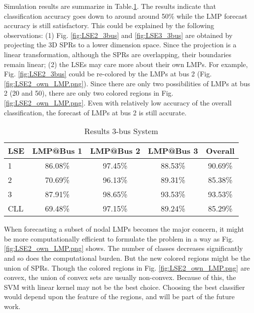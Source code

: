 \documentclass[letterpaper, 11pt]{article}
\theoremstyle{plain}
\theoremstyle{definition}
\begin{document}
Simulation results are summarize in Table.\ref{tab:LMP_forecast_lse_3bus_alllmp}.  
The results indicate that classification accuracy goes down to around around 50\% while the LMP forecast accuracy is still satisfactory. 
This could be explained by the following observations: (1) Fig. \ref{fig:LSE2_3bus} and \ref{fig:LSE3_3bus} are obtained by projecting the 3D SPRs to a lower dimension space. Since the projection is a linear transformation, although the SPRs are overlapping, their boundaries remain linear; (2) the LSEs may care more about their own LMPs. For example, Fig. \ref{fig:LSE2_3bus} could be re-colored by the LMPs at bus 2 (Fig. \ref{fig:LSE2_own_LMP.png}). Since there are only two possibilities of LMPs at bus 2 (20 and 50), there are only two colored regions in Fig. \ref{fig:LSE2_own_LMP.png}. Even with relatively low accuracy of the overall classification, the forecast of LMPs at bus 2 is still accurate.
\begin{table}[htbp]
  \caption{Results 3-bus System}
  \label{tab:LMP_forecast_lse_3bus_alllmp}
  \centering

  \begin{tabular}{l|cccc}
  \hline

  \hline
  \textbf{LSE} & \textbf{LMP@Bus 1} & \textbf{LMP@Bus 2} & \textbf{LMP@Bus 3} & \textbf{Overall}\\
  \hline
  1  & 86.08\%  &97.45\%  & 88.53\%  & 90.69\%\\
  2  &70.69\% & 96.13\% & 89.31\%   &  85.38\%\\
  3  &87.91\% & 98.65\% & 93.53\%  & 93.53\%\\
  \hline
  CLL & 69.48\% & 97.15\% & 89.24\% & 85.29\% \\
  \hline

  \hline
  \end{tabular}
\end{table}

When forecasting a subset of nodal LMPs becomes the major concern, it might be more computationally efficient to formulate the problem in a way as Fig. \ref{fig:LSE2_own_LMP.png} shows. The number of classes decreases significantly and so does the computational burden. But the new colored regions might be the union of SPRs. Though the colored regions in Fig. \ref{fig:LSE2_own_LMP.png} are convex, the union of convex sets are usually non-convex. Because of this, the SVM with linear kernel may not be the best choice. Choosing the best classifier would depend upon the feature of the regions, and will be part of the future work.
\end{document}
